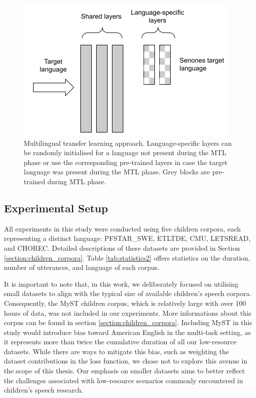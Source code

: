 \begin{figure}[t]
\begin{center}
\includegraphics[scale=0.5]{imgs/Ours_final.png}
\caption{Multilingual transfer learning approach. Language-specific layers can be randomly initialised for a language not present during the MTL phase or use the corresponding pre-trained layers in case the target language was present during the MTL phase. Grey blocks are pre-trained during MTL phase.}
\label{fig:MLTL1}
\end{center}
\end{figure}


\subsection{Experimental Setup}
\label{section:corpus}
All experiments in this study were conducted using five children corpora, each representing a distinct language: PFSTAR\_SWE, ETLTDE, CMU, LETSREAD, and CHOREC. Detailed descriptions of these datasets are provided in Section \ref{section:children_corpora}. Table \ref{tab:statistics2} offers statistics on the duration, number of utterances, and language of each corpus.

It is important to note that, in this work, we deliberately focused on utilising small datasets to align with the typical size of available children's speech corpora. Consequently, the MyST children corpus, which is relatively large with over 100 hours of data, was not included in our experiments. More informations about this corpus can be found in section \ref{section:children_corpora}. Including MyST in this study would introduce bias toward American English in the multi-task setting, as it represents more than twice the cumulative duration of all our low-resource datasets. While there are ways to mitigate this bias, such as weighting the dataset contributions in the loss function, we chose not to explore this avenue in the scope of this thesis. Our emphasis on smaller datasets aims to better reflect the challenges associated with low-resource scenarios commonly encountered in children's speech research.


